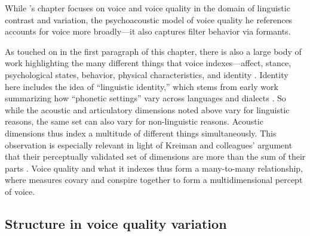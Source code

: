 While \citeauthor{garellek_2019_voice}'s \citeyearpar{garellek_2019_voice} chapter focuses on voice and voice quality in the domain of linguistic contrast and variation, the psychoacoustic model of voice quality he references \citep{kreiman_2014_theory} accounts for voice more broadly---it also captures filter behavior via formants. 

As touched on in the first paragraph of this chapter, there is also a large body of work highlighting the many different things that voice indexes---affect, stance, psychological states, behavior, physical characteristics, and identity \citep{podesva_2015_voice}. Identity here includes the idea of ``linguistic identity,'' which stems from early work summarizing how ``phonetic settings'' vary across languages and dialects \citep[see][]{podesva_2015_voice, pittam_1987_lts,mennen_2010_settings}. So while the acoustic and articulatory dimensions noted above vary for linguistic reasons, the same set can also vary for non-linguistic reasons. Acoustic dimensions thus index a multitude of different things simultaneously. This observation is especially relevant in light of Kreiman and colleagues' argument that their perceptually validated set of dimensions are more than the sum of their parts \citep{kreiman_2014_theory, kreiman_2021_validating}. Voice quality and what it indexes thus form a many-to-many relationship, where measures covary and conspire together to form a multidimensional percept of voice. 

\subsection{Structure in voice quality variation}\label{ch3:sec:voicestructure}

